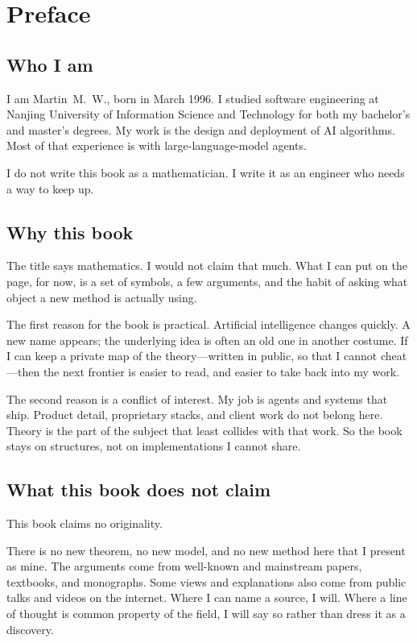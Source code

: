 \chapter*{Preface}
\label{front:preface}

\section*{Who I am}

I am Martin~M.~W., born in March 1996. I studied software engineering at Nanjing University of Information Science and Technology for both my bachelor's and master's degrees. My work is the design and deployment of AI algorithms. Most of that experience is with large-language-model agents.

I do not write this book as a mathematician. I write it as an engineer who needs a way to keep up.

\section*{Why this book}

The title says mathematics. I would not claim that much. What I can put on the page, for now, is a set of symbols, a few arguments, and the habit of asking what object a new method is actually using.

The first reason for the book is practical. Artificial intelligence changes quickly. A new name appears; the underlying idea is often an old one in another costume. If I can keep a private map of the theory---written in public, so that I cannot cheat---then the next frontier is easier to read, and easier to take back into my work.

The second reason is a conflict of interest. My job is agents and systems that ship. Product detail, proprietary stacks, and client work do not belong here. Theory is the part of the subject that least collides with that work. So the book stays on structures, not on implementations I cannot share.

\section*{What this book does not claim}

This book claims no originality.

There is no new theorem, no new model, and no new method here that I present as mine. The arguments come from well-known and mainstream papers, textbooks, and monographs. Some views and explanations also come from public talks and videos on the internet. Where I can name a source, I will. Where a line of thought is common property of the field, I will say so rather than dress it as a discovery.

